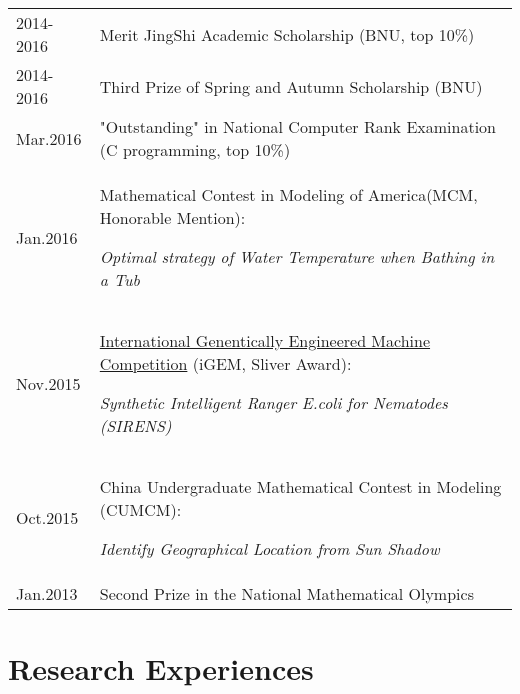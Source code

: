 \documentclass[a4paper,11pt]{article} %
\begin{document}
\begin{savenotes}
\begin{tabular}{p{2cm}|p{13cm}}

 2014-2016 & Merit JingShi Academic Scholarship (BNU, top 10\%)\\
 2014-2016 & Third Prize of Spring and Autumn Scholarship (BNU)\\
 Mar.2016 & "Outstanding" in National Computer Rank Examination (C programming, top 10\%)\\
 Jan.2016 & Mathematical Contest in Modeling of America(MCM, Honorable Mention):

 \emph{Optimal strategy of Water Temperature when Bathing in a Tub}\\
 Nov.2015 & \href{http://2015.igem.org/Team:BNU-CHINA/Team}{International Genentically Engineered Machine Competition} (iGEM, Sliver Award):

 \emph{Synthetic Intelligent Ranger E.coli for Nematodes (SIRENS)}\\
 Oct.2015 & China Undergraduate Mathematical Contest in Modeling (CUMCM):

 \emph{Identify Geographical Location from Sun Shadow}\\
 Jan.2013 & Second Prize in the National Mathematical Olympics\\

\end{tabular}
\end{savenotes}

\section{Research Experiences}
\end{document}

